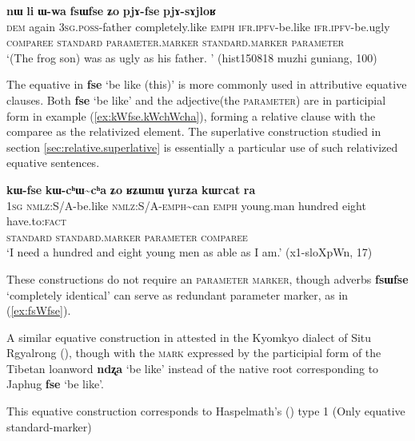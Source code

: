 \documentclass[oneside,a4paper,11pt]{article}
\newcommand{\ipa}[1]{{\phon\textbf{#1}}} %
\newcommand{\forme}[2]{\ipa{#1} `#2'}
\newcommand{\rdp}{\textasciitilde{}}
\begin{document}
\begin{exe}
\ex \label{ex:fsWfse}
\glll
\ipa{nɯ} 	\ipa{li} 	\ipa{ɯ-wa} 	\ipa{fsɯfse} 	\ipa{ʑo} 	\ipa{pjɤ-fse} 	\ipa{pjɤ-sɤjloʁ} \\
\textsc{dem} again \textsc{3sg.poss}-father completely.like \textsc{emph} \textsc{ifr.ipfv}-be.like \textsc{ifr.ipfv}-be.ugly \\
\textsc{comparee} { } \textsc{standard} \textsc{parameter.marker} { } \textsc{standard.marker} \textsc{parameter} \\
\glt `(The frog son) was as ugly as his father. ' (hist150818 muzhi guniang, 100)
\end{exe}

The equative in \forme{fse}{be like (this)} is more commonly used in attributive equative clauses. Both \forme{fse}{be like} and the adjective(the \textsc{parameter}) are in participial form in  example (\ref{ex:kWfse.kWchWcha}), forming a relative clause with the comparee as the relativized element. The superlative construction studied in section \ref{sec:relative.superlative} is essentially a particular use of such relativized equative sentences.

\begin{exe}
\ex \label{ex:kWfse.kWchWcha}
\glll \ipa{aʑo} 	\ipa{kɯ-fse} 	\ipa{kɯ-cʰɯ\rdp{}cʰa} 	\ipa{ʑo} 	\ipa{ʁʑɯnɯ} 	\ipa{ɣurʑa} 	\ipa{kɯrcat} 	\ipa{ra}  \\
\textsc{1sg} \textsc{nmlz}:S/A-be.like \textsc{nmlz}:S/A-\textsc{emph}\rdp{}can \textsc{emph} young.man hundred eight have.to:\textsc{fact} \\
\textsc{standard} \textsc{standard.marker} \textsc{parameter} { } \textsc{comparee} \\
\glt `I need a hundred and eight young men as able as I am.' (x1-sloXpWn, 17)
\end{exe}

These constructions do not require an \textsc{parameter marker}, though adverbs \forme{fsɯfse}{completely identical} can serve as redundant parameter marker, as in (\ref{ex:fsWfse}).

A similar equative construction in attested in the Kyomkyo dialect of Situ Rgyalrong (\citealt[238]{prins11kyomkyo}), though with the \textsc{mark} expressed by the participial form of the Tibetan loanword \forme{ndʐa}{be like} instead of the native root corresponding to Japhug \forme{fse}{be like}.

This equative construction corresponds to Haspelmath's (\citeyear{haspelmath17equative}) type 1 (Only equative standard-marker)
\end{document}

